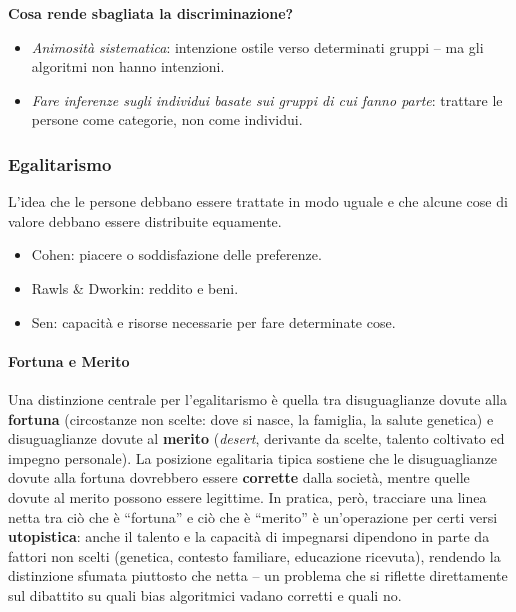\documentclass[a4paper,11pt]{article}
\begin{document}
\textbf{Cosa rende sbagliata la discriminazione?}
\begin{itemize}
  \item \emph{Animosit\`{a} sistematica}: intenzione ostile verso determinati gruppi -- ma gli algoritmi non hanno intenzioni.
  \item \emph{Fare inferenze sugli individui basate sui gruppi di cui fanno parte}: trattare le persone come categorie, non come individui.
\end{itemize}

\subsubsection{Egalitarismo}

\begin{definizione}[Egalitarismo]
L'idea che le persone debbano essere trattate in modo uguale e che alcune cose di valore debbano essere distribuite equamente.
\begin{itemize}
  \item Cohen: piacere o soddisfazione delle preferenze.
  \item Rawls \& Dworkin: reddito e beni.
  \item Sen: capacit\`{a} e risorse necessarie per fare determinate cose.
\end{itemize}
\end{definizione}

\paragraph{Fortuna e Merito}
Una distinzione centrale per l'egalitarismo \`{e} quella tra disuguaglianze dovute alla \textbf{fortuna} (circostanze non scelte: dove si nasce, la famiglia, la salute genetica) e disuguaglianze dovute al \textbf{merito} (\emph{desert}, derivante da scelte, talento coltivato ed impegno personale). La posizione egalitaria tipica sostiene che le disuguaglianze dovute alla fortuna dovrebbero essere \textbf{corrette} dalla societ\`{a}, mentre quelle dovute al merito possono essere legittime. In pratica, per\`{o}, tracciare una linea netta tra ci\`{o} che \`{e} ``fortuna'' e ci\`{o} che \`{e} ``merito'' \`{e} un'operazione per certi versi \textbf{utopistica}: anche il talento e la capacit\`{a} di impegnarsi dipendono in parte da fattori non scelti (genetica, contesto familiare, educazione ricevuta), rendendo la distinzione sfumata piuttosto che netta -- un problema che si riflette direttamente sul dibattito su quali bias algoritmici vadano corretti e quali no.
\end{document}
